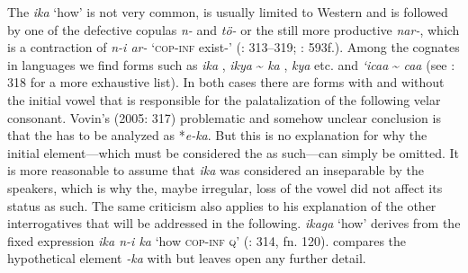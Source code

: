 The   \textit{ika} ‘how’ is not very common, is usually limited to Western  and is followed by one of the defective copulas \textit{n-} and \textit{tö-} or the still more productive \textit{nar-}, which is a contraction of \textit{n-i ar-} ‘\textsc{cop}-\textsc{inf} exist-’ (\citealt{Vovin2005}: 313--319; \citealt{Kupchik2011}: 593f.). Among the cognates in   languages we find  forms such as \textit{ika} , \textit{ikya}  {\textasciitilde} \textit{ka} , \textit{kya}  etc. and  \textit{‘icaa} {\textasciitilde} \textit{caa} (see \citealt{Vovin2005}: 318 for a more exhaustive list). In both cases there are forms with and without the initial vowel that is responsible for the palatalization of the following velar consonant. Vovin’s (2005: 317) problematic and somehow unclear conclusion is that the  has to be analyzed as *\textit{e-ka}. But this is no explanation for why the initial element---which must be considered the  as such---can simply be omitted. It is more reasonable to assume that \textit{ika} was considered an inseparable  by the speakers, which is why the, maybe irregular, loss of the vowel did not affect its  status as such. The same criticism also applies to his explanation of the other interrogatives that will be addressed in the following.  \textit{ikaga} ‘how’ derives from the  fixed expression \textit{ika n-i ka} ‘how \textsc{cop}-\textsc{inf} \textsc{q}’ (\citealt{Vovin2005}: 314, fn. 120). \citet[319]{Vovin2005} compares the hypothetical element \textit{-ka} with  but leaves open any further detail.


